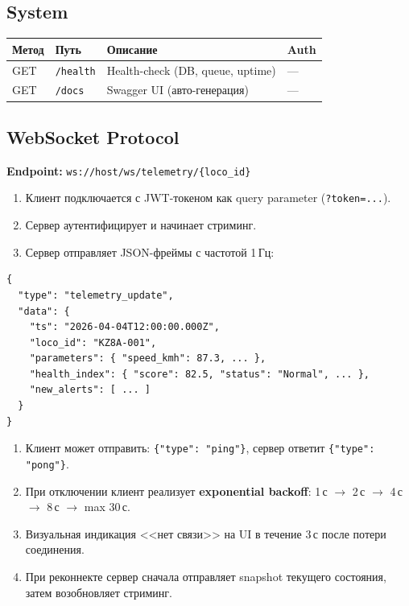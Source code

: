\documentclass[12pt,a4paper]{article}
\newcommand{\code}[1]{\texttt{#1}}
\begin{document}
\subsection{System}

\begin{tabularx}{\textwidth}{l l X l}
\toprule
\textbf{Метод} & \textbf{Путь} & \textbf{Описание} & \textbf{Auth} \\
\midrule
GET & \code{/health} & Health-check (DB, queue, uptime) & --- \\
GET & \code{/docs} & Swagger UI (авто-генерация) & --- \\
\bottomrule
\end{tabularx}

\subsection{WebSocket Protocol}

\textbf{Endpoint:} \code{ws://host/ws/telemetry/\{loco\_id\}}

\begin{enumerate}[nosep]
  \item Клиент подключается с JWT-токеном как query parameter (\code{?token=...}).
  \item Сервер аутентифицирует и начинает стриминг.
  \item Сервер отправляет JSON-фреймы с частотой 1\,Гц:
\end{enumerate}

\begin{lstlisting}
{
  "type": "telemetry_update",
  "data": {
    "ts": "2026-04-04T12:00:00.000Z",
    "loco_id": "KZ8A-001",
    "parameters": { "speed_kmh": 87.3, ... },
    "health_index": { "score": 82.5, "status": "Normal", ... },
    "new_alerts": [ ... ]
  }
}
\end{lstlisting}

\begin{enumerate}[nosep, start=4]
  \item Клиент может отправить: \code{\{"type": "ping"\}}, сервер ответит \code{\{"type": "pong"\}}.
  \item При отключении клиент реализует \textbf{exponential backoff}: 1\,с $\to$ 2\,с $\to$ 4\,с $\to$ 8\,с $\to$ max 30\,с.
  \item Визуальная индикация <<нет связи>> на UI в течение 3\,с после потери соединения.
  \item При реконнекте сервер сначала отправляет snapshot текущего состояния, затем возобновляет стриминг.
\end{enumerate}
\end{document}
